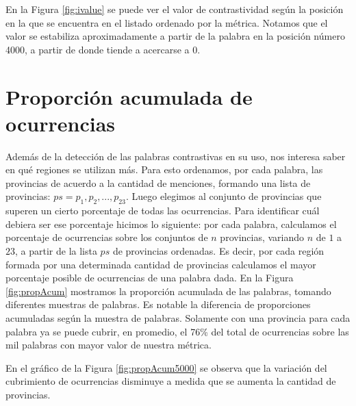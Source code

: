 En la Figura \ref{fig:ivalue} se puede ver el valor de contrastividad según la posición en la que se encuentra en el listado ordenado por la métrica. Notamos que el valor se estabiliza aproximadamente a partir de la palabra en la posición número 4000, a partir de donde tiende a acercarse a 0.





\section{Proporción acumulada de ocurrencias} %
\label{proporcionDeOcurrencias}
Además de la detección de las palabras contrastivas en su uso, nos interesa saber en qué regiones se utilizan más. Para esto ordenamos, por cada palabra, las provincias de acuerdo a la cantidad de menciones, formando una lista de provincias: $ps = p_1,p_2,...,p_{23}$. Luego elegimos al conjunto de provincias que superen un cierto porcentaje de todas las ocurrencias. Para identificar cuál debiera ser ese porcentaje hicimos lo siguiente: por cada palabra, calculamos el porcentaje de ocurrencias sobre los conjuntos de $n$ provincias, variando $n$ de $1$ a $23$, a partir de la lista $ps$ de provincias ordenadas. Es decir, por cada región formada por una determinada cantidad de provincias calculamos el mayor porcentaje posible de ocurrencias de una palabra dada.
En la Figura \ref{fig:propAcum} mostramos la proporción acumulada de las palabras, tomando diferentes muestras de palabras. Es notable la diferencia de proporciones acumuladas según la muestra de palabras. Solamente con una provincia para cada palabra ya se puede cubrir, en promedio, el 76\% del total de ocurrencias sobre las mil palabras con mayor valor de nuestra métrica.

En el gráfico de la Figura \ref{fig:propAcum5000} se observa que la variación del cubrimiento de ocurrencias disminuye a medida que se aumenta la cantidad de provincias. 




